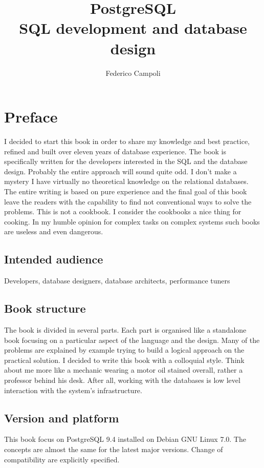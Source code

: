 \documentclass[oneside]{book}
\author{Federico Campoli}
\title{PostgreSQL  \\ SQL development and database design}
\begin{document}
\maketitle

\newpage{}



\tableofcontents{}

\chapter*{Preface}
I decided to start this book in order to share my knowledge and best practice, refined and built
over eleven years of database experience. The book is specifically written for the developers
interested in the SQL and the database design. Probably the entire approach will sound quite odd. I
don't make a mystery I have virtually no theoretical knowledge on the relational databases. The
entire writing is based on pure experience and the final goal of this book leave the readers with
the capability to find not conventional ways to solve the problems. This is not a cookbook.
I consider the cookbooks a nice thing for cooking. In my humble opinion for complex tasks on
complex systems such books are useless and even dangerous. 


\section*{Intended audience}
Developers, database designers, database architects, performance tuners

\section*{Book structure}
The book is divided in several parts. Each part is organised like a standalone book focusing
on a particular aspect of the language and the design. Many of the problems are
explained by example trying to build a logical approach on the practical solution. I decided to
write this book with a colloquial style. Think about me more like a mechanic wearing a motor
oil stained overall, rather a professor behind his desk. After all, working with the databases is
low level interaction with the system's infrastructure. \newline



\section*{Version and platform}
This book focus on PostgreSQL 9.4 installed on Debian GNU Linux 7.0. The concepts are almost the
same for the latest major versions. Change of compatibility are explicitly specified.
\end{document}

